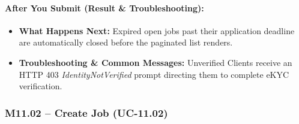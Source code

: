 \paragraph{After You Submit (Result \& Troubleshooting):}
\begin{itemize}[leftmargin=1.5em,itemsep=2pt]
  \item \textbf{What Happens Next:} Expired open jobs past their application deadline are automatically closed before the paginated list renders.
  \item \textbf{Troubleshooting \& Common Messages:} Unverified Clients receive an HTTP 403 \textit{IdentityNotVerified} prompt directing them to complete eKYC verification.
\end{itemize}

\newpage
\subsubsection{M11.02 -- Create Job (UC-11.02)}

